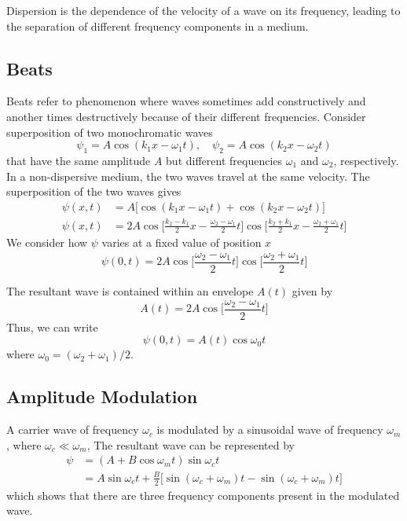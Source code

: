 \documentclass[../../../main.tex]{subfiles}
\begin{document}
Dispersion is the dependence of the velocity of a wave on its frequency, leading to the separation of different frequency components in a medium.
\subsection*{Beats}
Beats refer to phenomenon where waves sometimes add constructively and another times destructively because of their different frequencies. Consider superposition of two monochromatic waves
\begin{equation*}
    \psi_1=A \cos(k_1x - \omega_1t),\quad \psi_2=A \cos(k_2x - \omega_2t)
\end{equation*}
that have the same amplitude $A$ but different frequencies $\omega_1$ and $\omega_2$, respectively. In a non-dispersive medium, the two waves travel at the same velocity. The superposition of the two waves gives
\begin{align*}
    \psi(x,t)&=A\big[\cos(k_1x - \omega_1t)+ \cos(k_2x - \omega_2t)\big]\\
    \psi(x,t)&=2A\cos\bigg[\frac{k_2-k_1}{2}x-\frac{\omega_2-\omega_1}{2}t]\cos\bigg[\frac{k_2+k_1}{2}x-\frac{\omega_2+\omega_1}{2}t\bigg]
\end{align*}
We consider how $\psi$ varies at a ﬁxed value of position $x$
\begin{equation*}
    \psi(0,t)=2A\cos\bigg[\frac{\omega_2-\omega_1}{2}t\bigg] \cos\bigg[\frac{\omega_2+\omega_1}{2}t\bigg]
\end{equation*}

The resultant wave is contained within an envelope $A(t)$ given by
\begin{equation*}
    A(t)=2A\cos\bigg[\frac{\omega_2-\omega_1}{2}t\bigg]
\end{equation*}
Thus, we can write 
\begin{equation*}
    \psi(0,t)=A(t)\cos \omega_0 t
\end{equation*}
where $\omega_0=(\omega_2+\omega_1)/2$.

\subsection*{Amplitude Modulation}
A carrier wave of frequency $\omega_c$ is modulated by a sinusoidal wave of frequency $\omega_m$, where $\omega_c \ll \omega_m$, The resultant wave can be represented by
\begin{align*}
    \psi &= (A + B \cos \omega_mt) \sin \omega_ct\\
    &=A\sin \omega_ct+\frac{B}{2}\big[\sin (\omega_c+\omega_m)t-\sin (\omega_c+\omega_m)t\big]
\end{align*}
which shows that there are three frequency components present in the modulated wave. 
\end{document}
